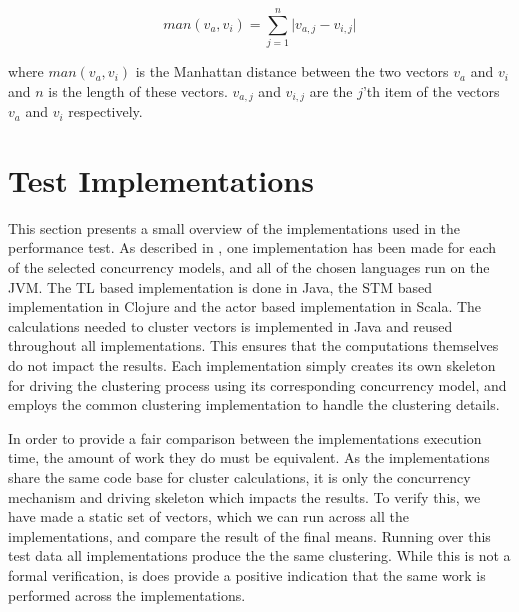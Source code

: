 \begin{equation}\label{eq:mandistance}
man(v_a,v_i)=\sum_{j=1}^{n}\lvert v_{a,j}-v_{i,j}\rvert
\end{equation}

where $man(v_a,v_i)$ is the Manhattan distance between the two vectors $v_a$ and $v_i$ and $n$ is the length of these vectors. $v_{a,j}$ and $v_{i,j}$ are the $j$'th item of the vectors $v_a$ and $v_i$ respectively.
%

\section{Test Implementations}
This section presents a small overview of the implementations used in the performance test. As described in , one implementation has been made for each of the selected concurrency models, and all of the chosen languages run on the \ac{JVM}. The \ac{TL} based implementation is done in Java, the \ac{STM} based implementation in Clojure and the actor based implementation in Scala. The calculations needed to cluster vectors is implemented in Java and reused throughout all implementations. This ensures that the computations themselves do not impact the results. Each implementation simply creates its own skeleton for driving the clustering process using its corresponding concurrency model, and employs the common clustering implementation to handle the clustering details. 

In order to provide a fair comparison between the implementations execution time, the amount of work they do must be equivalent. As the implementations share the same code base for cluster calculations, it is only the concurrency mechanism and driving skeleton which impacts the results. To verify this, we have made a static set of vectors, which we can run across all the implementations, and compare the result of the final means. Running over this test data all implementations produce the the same clustering. While this is not a formal verification, is does provide a positive indication that the same work is performed across the implementations.
%
